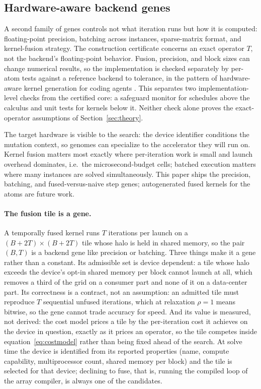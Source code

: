 \subsection{Hardware-aware backend genes}

A second family of genes controls not what iteration runs but
how it is computed: floating-point precision, batching across
instances, sparse-matrix format, and kernel-fusion strategy. The construction
certificate concerns an exact operator $T$, not the backend's floating-point
behavior. Fusion, precision, and block sizes can change numerical results,
so the implementation is checked separately by
per-atom tests against a reference backend to tolerance, in the pattern of
hardware-aware kernel generation for coding agents
\citep{Hawkeye2026}. This separates two implementation-level checks from
the certified core: a safeguard monitor for schedules above the calculus and
unit tests for kernels below it. Neither check alone proves the
exact-operator assumptions of Section~\ref{sec:theory}.

The target hardware is visible to the search: the device identifier
conditions the mutation context, so genomes can specialize to the
accelerator they will run on. Kernel fusion matters most exactly where
per-iteration work is small and launch overhead dominates, i.e.\ the
microsecond-budget cells; batched execution matters where many instances
are solved simultaneously. This paper ships the precision, batching, and
fused-versus-naive step genes; autogenerated fused kernels for the atoms are
future work.

\paragraph{The fusion tile is a gene.}
A temporally fused kernel runs $T$ iterations per launch on a $(B+2T) \times
(B+2T)$ tile whose halo is held in shared memory, so the pair $(B, T)$ is a
backend gene like precision or batching. Three things make it a gene rather
than a constant. Its admissible set is device dependent: a tile whose halo
exceeds the device's opt-in shared memory per block cannot launch at all, which
removes a third of the grid on a consumer part and none of it on a
data-center part. Its correctness is a contract, not an assumption: an
admitted tile must reproduce $T$ sequential unfused iterations, which at
relaxation $\rho = 1$ means bitwise, so the gene cannot trade accuracy for
speed. And its value is measured, not derived: the cost model prices a tile by
the per-iteration cost it achieves on the device in question, exactly as it
prices an operator, so the tile competes inside
equation~\eqref{eq:costmodel} rather than being fixed ahead of the search. At
solve time the device is identified from its reported properties (name, compute
capability, multiprocessor count, shared memory per block) and the tile is
selected for that device; declining to fuse, that is, running the compiled loop
of the array compiler, is always one of the candidates.

